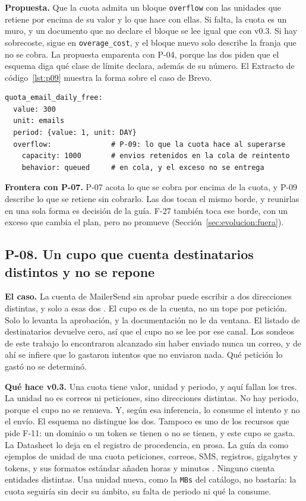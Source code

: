 \textbf{Propuesta.} Que la cuota admita un bloque \texttt{overflow} con las unidades que retiene por encima de su valor y lo que hace con ellas.
Si falta, la cuota es un muro, y un documento que no declare el bloque se lee igual que con v0.3.
Si hay sobrecoste, sigue en \texttt{overage\_cost}, y el bloque nuevo solo describe la franja que no se cobra.
La propuesta emparenta con P-04, porque las dos piden que el esquema diga qué clase de límite declara, además de su número.
El Extracto de código~\ref{lst:p09} muestra la forma sobre el caso de Brevo.

\begin{lstlisting}[style=datasheetyaml,caption={P-09: una cuota que retiene lo que la supera hasta un tope fijo (caso Brevo, plan gratuito, correo transaccional).},label={lst:p09}]
quota_email_daily_free:
  value: 300
  unit: emails
  period: {value: 1, unit: DAY}
  overflow:              # P-09: lo que la cuota hace al superarse
    capacity: 1000       # envios retenidos en la cola de reintento
    behavior: queued     # en cola, y el exceso no se entrega
\end{lstlisting}

\textbf{Frontera con P-07.} P-07 acota lo que se cobra por encima de la cuota, y P-09 describe lo que se retiene sin cobrarlo.
Las dos tocan el mismo borde, y reunirlas en una sola forma es decisión de la guía.
F-27 también toca ese borde, con un exceso que cambia el plan, pero no promueve (Sección~\ref{sec:evolucion:fuera}).

\subsection{P-08. Un cupo que cuenta destinatarios distintos y no se repone}
\label{subsec:evolucion:p08}

\textbf{El caso.} La cuenta de MailerSend sin aprobar puede escribir a dos
direcciones distintas, y solo a esas dos \citep{mailersenddocs}. El cupo es de la cuenta,
no un tope por petición. Solo lo levanta la aprobación, y la documentación no le da
ventana. El listado de destinatarios devuelve cero, así que el cupo no se lee por ese
canal. Los sondeos de este trabajo lo encontraron alcanzado sin haber enviado nunca un
correo, y de ahí se infiere que lo gastaron intentos que no enviaron nada. Qué petición
lo gastó no se determinó.

\textbf{Qué hace v0.3.} Una cuota tiene valor, unidad y periodo, y aquí fallan los
tres. La unidad no es correos ni peticiones, sino direcciones distintas. No hay
periodo, porque el cupo no se renueva. Y, según esa inferencia, lo consume el intento y no el envío. El esquema
no distingue los dos. Tampoco es uno de los recursos que pide
F-11: un dominio o un token se tienen o no se tienen, y este cupo se gasta. La
Datasheet lo deja en el registro de procedencia, en prosa.
La guía da como ejemplos de unidad de una cuota peticiones, correos, SMS, registros, gigabytes y tokens, y sus formatos estándar añaden horas y minutos \citep{apisconsumptionmodel}.
Ninguno cuenta entidades distintas.
Una unidad nueva, como la \texttt{MBs} del catálogo, no bastaría: la cuota seguiría sin decir su ámbito, su falta de periodo ni qué la consume.

